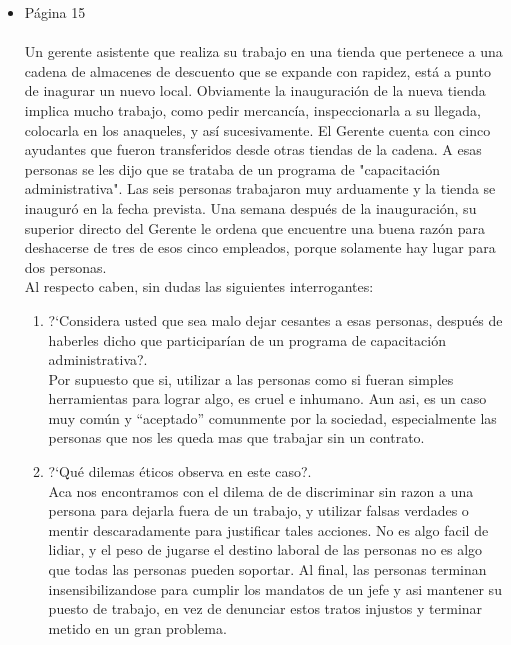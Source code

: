 \begin{itemize}
	\item P\'agina 15\\\\
	Un gerente asistente que realiza su trabajo en una tienda que pertenece a una cadena de almacenes de descuento que se expande
	con rapidez, est\'a a punto de inagurar un nuevo local. Obviamente la inauguraci\'on de la nueva tienda implica mucho trabajo, como
	pedir mercanc\'ia, inspeccionarla a su llegada, colocarla en los anaqueles, y as\'i sucesivamente. El Gerente cuenta con cinco
	ayudantes que fueron transferidos desde otras tiendas de la cadena. A esas personas se les dijo que se trataba de un programa de
	"capacitaci\'on administrativa". Las seis personas trabajaron muy arduamente y la tienda se inaugur\'o en la fecha prevista. Una
	semana despu\'es de la inauguraci\'on, su superior directo del Gerente le ordena que encuentre una buena raz\'on para deshacerse de
	tres de esos cinco empleados, porque solamente hay lugar para dos personas.\\
	Al respecto caben, sin dudas las siguientes interrogantes:\\
	\begin{enumerate}
		\item ?`Considera usted que sea malo dejar cesantes a esas personas, despu\'es de haberles dicho que participar\'ian de un programa de
capacitaci\'on administrativa?.\\
	Por supuesto que si, utilizar a las personas como si fueran simples herramientas para lograr algo, es cruel e inhumano. Aun asi, es un caso muy com\'un y ``aceptado'' comunmente por la sociedad, especialmente las personas que nos les queda mas que trabajar sin un contrato.

		\item ?`Qu\'e dilemas \'eticos observa en este caso?.\\
	Aca nos encontramos con el dilema de de discriminar sin razon a una persona para dejarla fuera de un trabajo, y utilizar falsas verdades o mentir descaradamente para justificar tales acciones. No es algo facil de lidiar, y el peso de jugarse el destino laboral de las personas no es algo que todas las personas pueden soportar. Al final, las personas terminan insensibilizandose para cumplir los mandatos de un jefe y asi mantener su puesto de trabajo, en vez de denunciar estos tratos injustos y terminar metido en un gran problema.


\end{enumerate}
\end{itemize}
